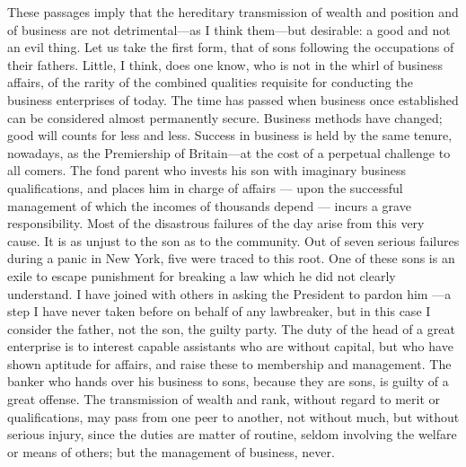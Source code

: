 \documentclass[11pt,openany]{book}
\begin{document}
These passages imply that the hereditary transmission of wealth and position and of business are not detrimental---as I think them---but desirable: a good and not an evil thing. Let us take the first form, that of sons following the occupations of their fathers. Little, I think, does one know, who is not in the whirl of business affairs, of the rarity of the combined qualities requisite for conducting the business enterprises of today. The time has passed when business once established can be considered almost permanently secure. Business methods have changed; good will counts for less and less. Success in business is held by the same tenure, nowadays, as the Premiership of Britain---at the cost of a perpetual challenge to all comers. The fond parent who invests his son with imaginary business qualifications, and places him in charge of affairs --- upon the successful management of which the incomes of thousands depend --- incurs a grave responsibility. Most of the disastrous failures of the day arise from this very cause. It is as unjust to the son as to the community. Out of seven serious failures during a panic in New York, five were traced to this root. One of these sons is an exile to escape punishment for breaking a law which he did not clearly understand. I have joined with others in asking the President to pardon him ---a step I have never taken before on behalf of any lawbreaker, but in this case I consider the father, not the son, the guilty party. The duty of the head of a great enterprise is to interest capable assistants who are without capital, but who have shown aptitude for affairs, and raise these to membership and management. The banker who hands over his business to sons, because they are sons, is guilty of a great offense. The transmission of wealth and rank, without regard to merit or qualifications, may pass from one peer to another, not without much, but without serious injury, since the duties are matter of routine, seldom involving the welfare or means of others; but the management of business, never.
\end{document}
